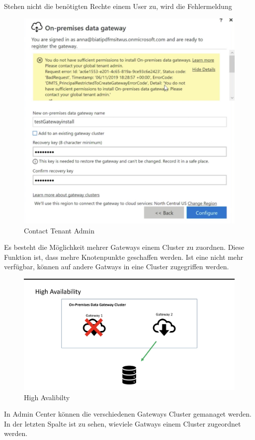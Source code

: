 Stehen nicht die benötigten Rechte einem User zu, wird die Fehlermeldung 
\begin{figure}[H]
	\centering
	\includegraphics[scale = 0.3]{attachment/chapter_1/Scc130}
	\caption{Contact Tenant Admin}
\end{figure}

Es besteht die Möglichkeit mehrer Gateways einem Cluster zu zuordnen.
Diese Funktion ist, dass mehre Knotenpunkte geschaffen werden. Ist eine nicht mehr verfügbar, können auf andere Gatways in eine Cluster zugegriffen werden.

\begin{figure}[H]
	\centering
	\includegraphics[scale = 0.3]{attachment/chapter_1/Scc134}
	\caption{High Avalibilty}
\end{figure}
In Admin Center können die verschiedenen Gateways Cluster gemanaget werden. In der letzten Spalte ist zu sehen, wieviele Gatways einem Cluster zugeordnet werden.

